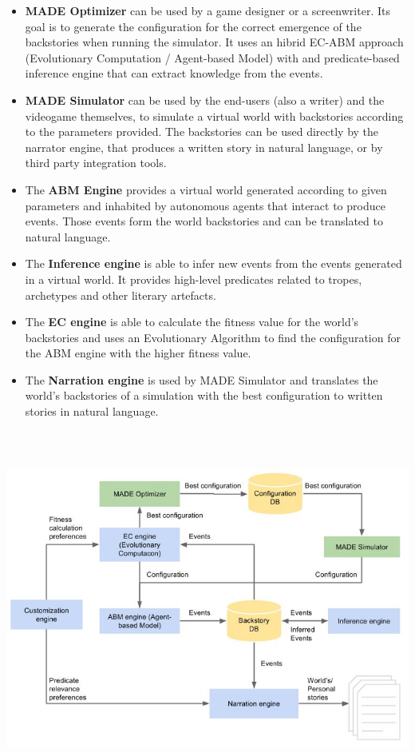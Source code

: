 \documentclass[a4paper]{article}
\newcommand\textstyleStrongEmphasis[1]{\textbf{#1}}
\newcommand\liststyleLix{%
\renewcommand\labelitemi{{\textbullet}}
\renewcommand\labelitemii{{\textbullet}}
\renewcommand\labelitemiii{{\textbullet}}
\renewcommand\labelitemiv{{\textbullet}}
}
\begin{document}
\liststyleLix
\begin{itemize}
\item \textstyleStrongEmphasis{MADE Optimizer} can be used by a game
designer or a screenwriter. Its goal is to generate the configuration
for the correct emergence of the backstories when running the
simulator. It uses an hibrid EC-ABM approach (Evolutionary Computation
/ Agent-based Model) with and predicate-based inference engine that can
extract knowledge from the events. 
\item \textstyleStrongEmphasis{MADE Simulator} can be used by the
end-users (also a writer) and the videogame themselves, to simulate a
virtual world with backstories according to the parameters provided.
The backstories can be used directly by the narrator engine, that
produces a written story in natural language, or by third party
integration tools. 
\item The \textstyleStrongEmphasis{ABM Engine} provides a virtual world
generated according to given parameters and inhabited by autonomous
agents that interact to produce events. Those events form the world
backstories and can be translated to natural language. 
\item The \textstyleStrongEmphasis{Inference engine} is able to infer
new events from the events generated in a virtual world. It provides
high-level predicates related to tropes, archetypes and other literary
artefacts. 
\item The \textstyleStrongEmphasis{EC engine} is able to calculate the
fitness value for the world{\textquoteright}s backstories and uses an
Evolutionary Algorithm to find the configuration for the ABM engine
with the higher fitness value. 
\item The \textstyleStrongEmphasis{Narration engine} is used by MADE
Simulator and translates the world{\textquoteright}s backstories of a
simulation with the best configuration to written stories in natural
language. 


\bigskip
\end{itemize}
\href{http://www.velonuboso.com/made/blog/wp-content/uploads/2015/06/MADEs-architecture.jpg}{
\includegraphics[width=16.928cm,height=11.723cm]{makingofmade113-img10.jpg}
}
\end{document}
